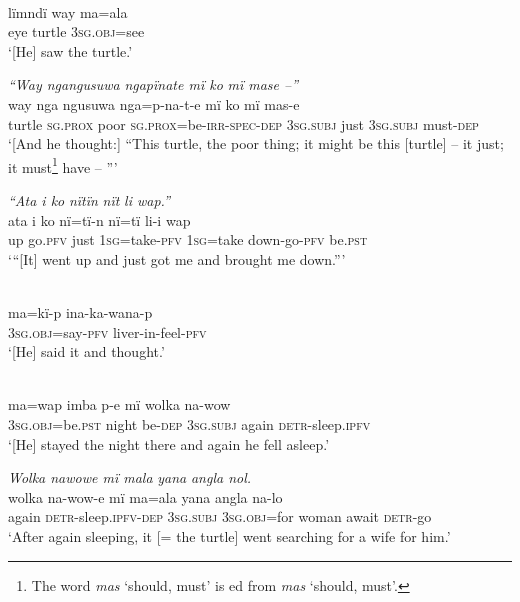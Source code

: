\\
\gll lïmndï  way  ma=ala\\
eye    turtle  3\textsc{sg.obj}=see\\
\glt ‘[He] saw the turtle.’

\ex \textit{“Way ngangusuwa} {\textit{ngapïnate mï ko}} \textit{mï mase --”}\\
\gll way  nga      ngusuwa  nga=p-na-t-e           mï      ko mï      mas{{}-e}\\
turtle  \textsc{sg.prox}  poor    \textsc{sg.prox}=be-\textsc{irr-spec-dep}  3\textsc{sg.subj}  just 3\textsc{sg.subj}  must-\textsc{dep}\\
\glt ‘[And he thought:] “This turtle, the poor thing; it might be this [turtle] -- it just; it must\footnote{The  word \textit{mas} ‘should, must’ is ed from  \textit{mas} ‘should, must’.} have -- ”’

\ex \textit{“Ata i ko} {\textit{nïtïn}} \textit{n}{\textit{ït}} \textit{li w}{\textit{a}}\textit{p.”}\\
\gll ata  i    ko  {nï=tï-n} n{ï=tï} li-i        w{a}p\\
up  go.\textsc{pfv}  just  1\textsc{sg}=take-\textsc{pfv}  1\textsc{sg}=take  down-go-\textsc{pfv}  be.\textsc{pst}\\
\glt ‘“{[It] went up and just got me and brought me down.”}’

\\
\gll ma=kï-p      ina-ka-wana-p\\
3\textsc{sg.obj}=say-\textsc{pfv}  liver-in-feel-\textsc{pfv}\\
\glt ‘[He] said it and thought.’

\\
\gll ma{=}wap      imba p{{}-}e    mï      wolka  na{{}-}w{ow}\\
3\textsc{sg.obj}=be.\textsc{pst}  night  be\textsc{{}-dep}  \textsc{3sg.subj} again  \textsc{detr-}sleep\textsc{.ipfv}\\
\glt ‘[He] stayed the night there and again he {fell a}sle{e}p.’

\ex \textit{Wolka nawowe mï mal}{\textit{a}} \textit{yana} {\textit{a}}\textit{ng}{\textit{l}}\textit{a n}{\textit{o}}\textit{l.}\\
\gll wolka  na{{}-}wow{}-e        mï      ma=al{a} yana     {a}ng{l}a n{a-}lo\\
again  \textsc{detr-}sleep\textsc{.ipfv{}-dep}  \textsc{3sg.subj}  \textsc{3sg.obj=}for  woman    await \textsc{detr}{}-go\\
\glt ‘After again sleeping, it [= the turtle] went searching for a wife for him.’

